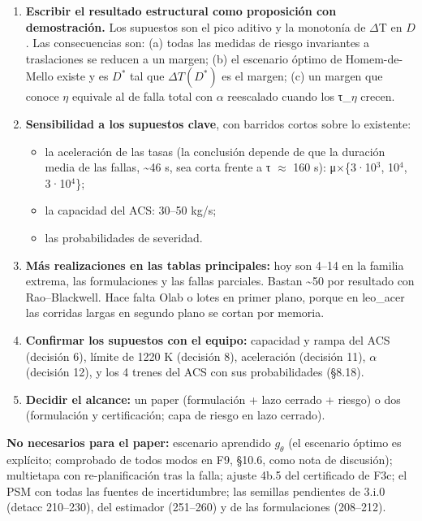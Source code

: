 \documentclass[11pt,a4paper]{article}
\begin{document}
\begin{enumerate}
\item \textbf{Escribir el resultado estructural como proposición con demostración.} Los supuestos son el pico aditivo y la monotonía de $\Delta$T en $D$. Las consecuencias son: (a) todas las medidas de riesgo invariantes a traslaciones se reducen a un margen; (b) el escenario óptimo de Homem-de-Mello existe y es $D^*$ tal que $\Delta T(D^*)$ es el margen; (c) un margen que conoce $\eta$ equivale al de falla total con $\alpha$ reescalado cuando los τ\_$\eta$ crecen.
\item \textbf{Sensibilidad a los supuestos clave}, con barridos cortos sobre lo existente:
\begin{itemize}
\item la aceleración de las tasas (la conclusión depende de que la duración media de las fallas, \textasciitilde{}46 s, sea corta frente a τ $\approx$ 160 s): μ$\times$\{3·10$^{3}$, 10$^{4}$, 3·10$^{4}$\};
\item la capacidad del ACS: 30–50 kg/s;
\item las probabilidades de severidad.
\end{itemize}
\item \textbf{Más realizaciones en las tablas principales:} hoy son 4–14 en la familia extrema, las formulaciones y las fallas parciales. Bastan \textasciitilde{}50 por resultado con Rao–Blackwell. Hace falta Olab o lotes en primer plano, porque en leo\_acer las corridas largas en segundo plano se cortan por memoria.
\item \textbf{Confirmar los supuestos con el equipo:} capacidad y rampa del ACS (decisión 6), límite de 1220 K (decisión 8), aceleración (decisión 11), $\alpha$ (decisión 12), y los 4 trenes del ACS con sus probabilidades (\S{}8.18).
\item \textbf{Decidir el alcance:} un paper (formulación + lazo cerrado + riesgo) o dos (formulación y certificación; capa de riesgo en lazo cerrado).
\end{enumerate}

\textbf{No necesarios para el paper:} escenario aprendido $g_\theta$ (el escenario óptimo es explícito; comprobado de todos modos en F9, \S{}10.6, como nota de discusión); multietapa con re-planificación tras la falla; ajuste 4b.5 del certificado de F3c; el PSM con todas las fuentes de incertidumbre; las semillas pendientes de 3.i.0 (detacc 210–230), del estimador (251–260) y de las formulaciones (208–212).
\end{document}
